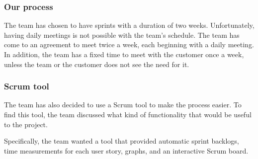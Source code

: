 \subsubsection{Our process}
The team has chosen to have sprints with a duration of two weeks. Unfortunately, having daily meetings is not possible with the team's schedule. The team has come to an agreement to meet twice a week, each beginning with a daily meeting. In addition, the team has a fixed time to meet with the customer once a week, unless the team or the customer does not see the need for it.

\subsubsection{Scrum tool}
\label{sec:scrumtool}
The team has also decided to use a Scrum tool to make the process easier.
To find this tool, the team discussed what kind of functionality that would be useful to the project.

Specifically, the team wanted a tool that provided automatic sprint backlogs,
time measurements for each user story, graphs, and an interactive Scrum board.
